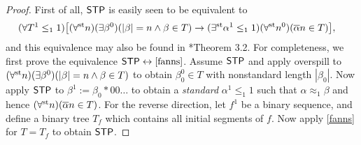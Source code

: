 \documentclass[reqno]{amsart}
\def\STP{\textup{\textsf{STP}}}
\def\st{\textup{st}}
\def\di{\rightarrow}
\def\asa{\leftrightarrow}
\numberwithin{equation}{section}
\numberwithin{thm}{section}
\begin{document}
\begin{proof}  
First of all, $\STP$ is easily seen to be equivalent to 
\begin{align}\label{fanns}
(\forall T^{1}\leq_{1}1)\big[(\forall^{\st}n)(\exists \beta^{0})&(|\beta|=n \wedge \beta\in T ) \di (\exists^{\st}\alpha^{1}\leq_{1}1)(\forall^{\st}n^{0})(\overline{\alpha}n\in T)   \big],
\end{align}
and this equivalence may also be found in \cite{samGH}*{Theorem 3.2}.  For completeness, we first prove the equivalence $\STP\asa \eqref{fanns}$.
Assume $\STP$ and apply overspill to $(\forall^{\st}n)(\exists \beta^{0})(|\beta|=n \wedge \beta\in T )$ to obtain $\beta_{0}^{0}\in T$ with nonstandard length $|\beta_{0}|$.  
Now apply $\STP$ to $\beta^{1}:=\beta_{0}*00\dots$ to obtain a \emph{standard} $\alpha^{1}\leq_{1}1$ such that $\alpha\approx_{1}\beta$ and hence $(\forall^{\st}n)(\overline{\alpha}n\in T)$.  
For the reverse direction, let $f^{1}$ be a binary sequence, and define a binary tree $T_{f}$ which contains all initial segments of $f$.  
Now apply \eqref{fanns} for $T=T_{f}$ to obtain $\STP$.    

\medskip


\end{proof}
\end{document}
